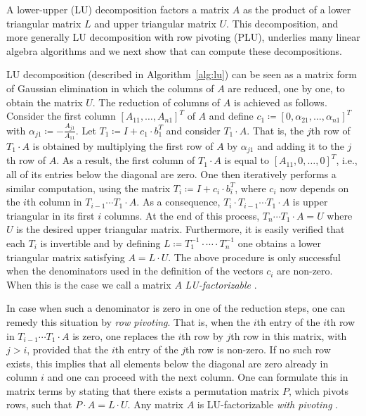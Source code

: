 A lower-upper (LU) decomposition factors a matrix $A$ as the product of a lower triangular matrix $L$ and upper triangular matrix $U$.  
This decomposition, and more generally LU decomposition with row pivoting (PLU),  underlies many linear algebra algorithms and 
we next show that \langfor can compute these decompositions.

LU decomposition (described in Algorithm~\ref{alg:lu}) can be seen as a matrix form of Gaussian elimination in which the columns of $A$
are reduced, one by one, to obtain the matrix $U$. The reduction of columns of $A$ is achieved
as follows. Consider the first column $[A_{11},\ldots,A_{n1}]^T$ of $A$ and  define 
$c_1 \coloneqq   [0, \alpha_{21},\ldots, \alpha_{n1}]^T$ 
with $\alpha_{j1} \coloneqq   -\frac{A_{j1}}{A_{11}}$. Let $T_1\coloneqq  I+ c_1\cdot b_1^T$ and consider
$T_1\cdot A$. That is, the $j$th row of $T_1\cdot A$ is obtained by multiplying the first row of $A$ by $\alpha_{j1}$ and adding it to the $j$th row of $A$. As a result, the first column of $T_1\cdot A$ is equal to $[A_{11},0,\ldots,0]^T$, i.e., 
all of its entries below the diagonal are zero.  One then iteratively performs a similar computation, using the matrix $T_i\coloneqq  I+c_i\cdot b_i^T$, where $c_i$ now depends on the $i$th column in $T_{i-1}\cdots T_1\cdot A$. As a consequence, $T_i\cdot T_{i-1}\cdots T_1\cdot A$ is upper triangular
in its first $i$ columns. At the end of this process, $T_n\cdots T_1\cdot A=U$ where $U$ is the desired upper triangular matrix.
Furthermore, it is easily verified that each $T_i$ is invertible and by defining $L\coloneqq  T_1^{-1}\cdot\cdots\cdot T_n^{-1}$ one obtains a lower triangular matrix satisfying $A=L\cdot U$. The above procedure is only successful when the denominators used in the definition of the vectors $c_i$ are non-zero. When this is the case we call a matrix $A$ \textit{LU-factorizable} \cite{num}. 

In case when such a denominator is zero in one of the reduction steps, one can remedy this situation by \textit{row pivoting}. That is, when the $i$th entry of the
$i$th row in $T_{i-1}\cdots T_1\cdot A$ is zero, one replaces the $i$th row by  $j$th row in this matrix, with $j>i$, provided that the $i$th entry of the $j$th row is non-zero. If no such row exists, this implies that all elements below the diagonal are zero already in column $i$ and one can proceed with the next column. One can formulate this in matrix terms by stating that there exists a permutation matrix $P$, which pivots rows, such that $P\cdot A=L\cdot U$. Any matrix $A$ is LU-factorizable \textit{with pivoting} \cite{num}.


